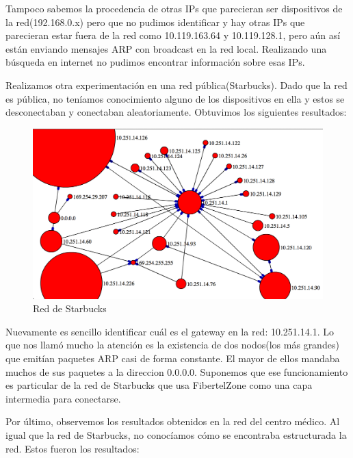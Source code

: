 Tampoco sabemos la procedencia de otras IPs que parecieran ser dispositivos de la red(192.168.0.x) pero que no pudimos identificar y hay otras IPs que parecieran estar fuera de la red como 10.119.163.64 y 10.119.128.1, pero aún así están enviando mensajes ARP con broadcast en la red local. Realizando una búsqueda en internet no pudimos encontrar información sobre esas IPs.

Realizamos otra experimentación en una red pública(Starbucks). Dado que la red es pública, no teníamos conocimiento alguno de los dispositivos en ella y estos se desconectaban y conectaban aleatoriamente. Obtuvimos los siguientes resultados:

\begin{figure}[!h]
	\begin{center}
		  \includegraphics[scale=0.4]{Graficos/grafico_3.png}
		  \caption{Red de Starbucks}
		  \label{fig:contra1}
	\end{center}
\end{figure}

Nuevamente es sencillo identificar cuál es el gateway en la red: 10.251.14.1. Lo que nos llamó mucho la atención es la existencia de dos nodos(los más grandes) que emitían paquetes ARP casi de forma constante. El mayor de ellos mandaba muchos de sus paquetes a la direccion 0.0.0.0. Suponemos que ese funcionamiento es particular de la red de Starbucks que usa FibertelZone como una capa intermedia para conectarse.

Por último, observemos los resultados obtenidos en la red del centro médico. Al igual que la red de Starbucks, no conocíamos cómo se encontraba estructurada la red. Estos fueron los resultados:

